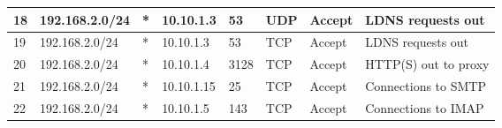 \documentclass[a4paper, 11pt, oneside]{article}
\begin{document}
\begin{table}[H]
{\begin{tabular}{|llllllll|}
\multicolumn{1}{|l|}{18}                        & \multicolumn{1}{l|}{192.168.2.0/24}                                               & \multicolumn{1}{l|}{*}                                                              & \multicolumn{1}{l|}{10.10.1.3}                                                         & \multicolumn{1}{l|}{53}                                                                  & \multicolumn{1}{l|}{UDP}               & \multicolumn{1}{l|}{Accept}          & LDNS requests out                      \\ \hline
\multicolumn{1}{|l|}{19}                        & \multicolumn{1}{l|}{192.168.2.0/24}                                               & \multicolumn{1}{l|}{*}                                                              & \multicolumn{1}{l|}{10.10.1.3}                                                         & \multicolumn{1}{l|}{53}                                                                  & \multicolumn{1}{l|}{TCP}               & \multicolumn{1}{l|}{Accept}          & LDNS requests out                      \\ \hline
\multicolumn{1}{|l|}{20}                        & \multicolumn{1}{l|}{192.168.2.0/24}                                               & \multicolumn{1}{l|}{*}                                                              & \multicolumn{1}{l|}{10.10.1.4}                                                         & \multicolumn{1}{l|}{3128}                                                                & \multicolumn{1}{l|}{TCP}               & \multicolumn{1}{l|}{Accept}          & HTTP(S) out to proxy                   \\ \hline
\multicolumn{1}{|l|}{21}                        & \multicolumn{1}{l|}{192.168.2.0/24}                                               & \multicolumn{1}{l|}{*}                                                              & \multicolumn{1}{l|}{10.10.1.15}                                                        & \multicolumn{1}{l|}{25}                                                                  & \multicolumn{1}{l|}{TCP}               & \multicolumn{1}{l|}{Accept}          & Connections to SMTP                    \\ \hline
\multicolumn{1}{|l|}{22}                        & \multicolumn{1}{l|}{192.168.2.0/24}                                               & \multicolumn{1}{l|}{*}                                                              & \multicolumn{1}{l|}{10.10.1.5}                                                         & \multicolumn{1}{l|}{143}                                                                 & \multicolumn{1}{l|}{TCP}               & \multicolumn{1}{l|}{Accept}          & Connections to IMAP                    \\ \hline

\end{tabular}}
\end{table}
\end{document}
